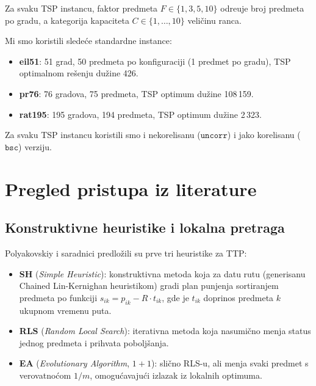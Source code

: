 \documentclass[12pt,a4paper]{article}
\begin{document}
Za svaku TSP instancu, faktor predmeta $F \in \{1, 3, 5, 10\}$ odre\dj{}uje broj predmeta po gradu, a kategorija kapaciteta $C \in \{1, \ldots, 10\}$ veli\v{c}inu ranca. 

Mi smo koristili slede\'{c}e standardne instance:
\begin{itemize}
    \item \textbf{eil51}: 51 grad, 50 predmeta po konfiguraciji (1 predmet po gradu), TSP optimalnom rešenju du\v{z}ine 426.
    \item \textbf{pr76}: 76 gradova, 75 predmeta, TSP optimum du\v{z}ine 108\,159.
    \item \textbf{rat195}: 195 gradova, 194 predmeta, TSP optimum du\v{z}ine 2\,323.
\end{itemize}

Za svaku TSP instancu koristili smo i nekorelisanu ($\texttt{uncorr}$) i jako korelisanu ($\texttt{bsc}$) verziju.

\section{Pregled pristupa iz literature}

\subsection{Konstruktivne heuristike i lokalna pretraga}

Polyakovskiy i saradnici \cite{polyakovskiy2014} predlo\v{z}ili su prve tri heuristike za TTP:
\begin{itemize}
    \item \textbf{SH} (\textit{Simple Heuristic}): konstruktivna metoda koja za datu rutu (generisanu Chained Lin-Kernighan heuristikom) gradi plan punjenja sortiranjem predmeta po funkciji $s_{ik} = p_{ik} - R \cdot t_{ik}$, gde je $t_{ik}$ doprinos predmeta $k$ ukupnom vremenu puta.
    \item \textbf{RLS} (\textit{Random Local Search}): iterativna metoda koja nasumi\v{c}no menja status jednog predmeta i prihvata pobolj\v{s}anja.
    \item \textbf{EA} (\textit{Evolutionary Algorithm}, $1+1$): sli\v{c}no RLS-u, ali menja svaki predmet s verovatno\'{c}om $1/m$, omogu\'{c}avaju\'{c}i izlazak iz lokalnih optimuma.
\end{itemize}
\end{document}
